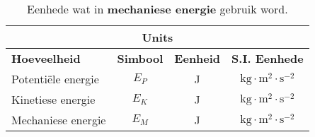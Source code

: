 \begin{table}[H]
\begin{center}
\begin{tabular}{|l|c|c|c|}\hline \hline 
\multicolumn{4}{|c|}{\textbf{Units}}\\ \hline \hline
\textbf{Hoeveelheid} & \textbf{Simbool} & \textbf{Eenheid} & \textbf{S.I. Eenhede}\\ \hline
Potenti\"ele energie & $E_{P}$ & J & $\text{kg} \cdot \text{m}^{2} \cdot \text{s}^{-2}$ \\ \hline
Kinetiese energie & $E_{K}$ & J & $\text{kg} \cdot \text{m}^{2} \cdot \text{s}^{-2}$ \\ \hline
Mechaniese energie & $E_{M}$ & J & $\text{kg} \cdot \text{m}^{2} \cdot \text{s}^{-2}$ \\ \hline
\end{tabular}
\end{center}
\caption{Eenhede wat in \textbf{mechaniese energie} gebruik word.}
\label{table:electricity::units}
\end{table}
    \label{m38786*cid9}
